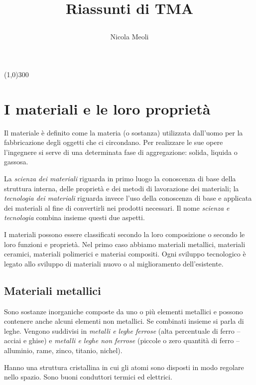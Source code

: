 \documentclass[a5paper,12pt]{article}
\begin{document}
\title{
	\begin{Huge}
		\textbf{Riassunti di TMA}
	\end{Huge}
}
\author{
	\begin{huge}
		Nicola Meoli
	\end{huge}
}	
\date{}
\maketitle
\begin{center}
\line(1,0){300}
\end{center}

\section{I materiali e le loro proprietà}
Il materiale è definito come la materia (o sostanza) utilizzata dall'uomo per la fabbricazione degli oggetti che ci circondano. Per realizzare le sue opere l'ingegnere si serve di una determinata fase di aggregazione: solida, liquida o gassosa. 

La \emph{scienza dei materiali} riguarda in primo luogo la conoscenza di base della struttura interna, delle proprietà e dei metodi di lavorazione dei materiali; la \emph{tecnologia dei materiali} riguarda invece l'uso della conoscenza di base e applicata dei materiali al fine di convertirli nei prodotti necessari. Il nome \emph{scienza e tecnologia} combina insieme questi due aspetti.

I materiali possono essere classificati secondo la loro composizione o secondo le loro funzioni e proprietà. Nel primo caso abbiamo materiali metallici, materiali ceramici, materiali polimerici e materiai compositi. Ogni sviluppo tecnologico è legato allo sviluppo di materiali nuovo o al miglioramento dell'esistente. 
\subsection{Materiali metallici}
Sono sostanze inorganiche composte da uno o più elementi metallici e possono contenere anche alcuni elementi non metallici. Se combinati insieme si parla di leghe. Vengono suddivisi in \emph{metalli e leghe ferrose} (alta percentuale di ferro -- acciai e ghise) e \emph{metalli e leghe non ferrose} (piccole o zero quantità di ferro -- alluminio, rame, zinco, titanio, nichel).

Hanno una struttura cristallina in cui gli atomi sono disposti in modo regolare nello spazio. Sono buoni conduttori termici ed elettrici.
\end{document}
